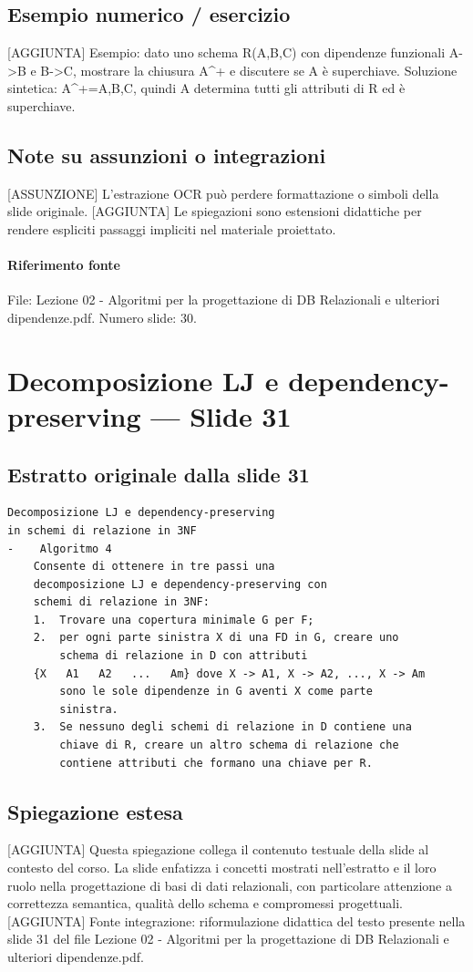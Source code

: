 \documentclass[11pt]{article}
\begin{document}
\subsection*{Esempio numerico / esercizio}
[AGGIUNTA] Esempio: dato uno schema R(A,B,C) con dipendenze funzionali A->B e B->C, mostrare la chiusura A^+ e discutere se A è superchiave. Soluzione sintetica: A^+={A,B,C}, quindi A determina tutti gli attributi di R ed è superchiave.
\subsection*{Note su assunzioni o integrazioni}
[ASSUNZIONE] L'estrazione OCR può perdere formattazione o simboli della slide originale.
[AGGIUNTA] Le spiegazioni sono estensioni didattiche per rendere espliciti passaggi impliciti nel materiale proiettato.
\paragraph{Riferimento fonte} File: Lezione 02 - Algoritmi per la progettazione di DB Relazionali e ulteriori dipendenze.pdf. Numero slide: 30.
\section{Decomposizione LJ e dependency-preserving --- Slide 31}
\subsection*{Estratto originale dalla slide 31}
\begin{lstlisting}
Decomposizione LJ e dependency-preserving
in schemi di relazione in 3NF
-    Algoritmo 4
    Consente di ottenere in tre passi una
    decomposizione LJ e dependency-preserving con
    schemi di relazione in 3NF:
    1.  Trovare una copertura minimale G per F;
    2.  per ogni parte sinistra X di una FD in G, creare uno
        schema di relazione in D con attributi
    {X   A1   A2   ...   Am} dove X -> A1, X -> A2, ..., X -> Am
        sono le sole dipendenze in G aventi X come parte
        sinistra.
    3.  Se nessuno degli schemi di relazione in D contiene una
        chiave di R, creare un altro schema di relazione che
        contiene attributi che formano una chiave per R.
\end{lstlisting}
\subsection*{Spiegazione estesa}
[AGGIUNTA] Questa spiegazione collega il contenuto testuale della slide al contesto del corso. La slide enfatizza i concetti mostrati nell'estratto e il loro ruolo nella progettazione di basi di dati relazionali, con particolare attenzione a correttezza semantica, qualità dello schema e compromessi progettuali.
[AGGIUNTA] Fonte integrazione: riformulazione didattica del testo presente nella slide 31 del file Lezione 02 - Algoritmi per la progettazione di DB Relazionali e ulteriori dipendenze.pdf.
\end{document}
